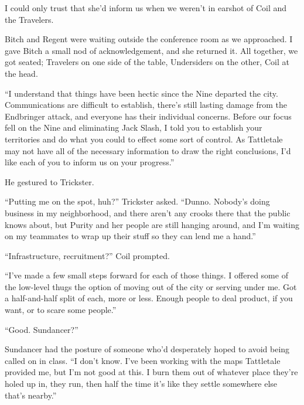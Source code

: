 I could only trust that she'd inform us when we weren't in earshot of Coil and the Travelers.



Bitch and Regent were waiting outside the conference room as we approached.  I gave Bitch a small nod of acknowledgement, and she returned it.  All together, we got seated; Travelers on one side of the table, Undersiders on the other, Coil at the head.



``I understand that things have been hectic since the Nine departed the city.  Communications are difficult to establish, there's still lasting damage from the Endbringer attack, and everyone has their individual concerns.  Before our focus fell on the Nine and eliminating Jack Slash, I told you to establish your territories and do what you could to effect some sort of control.  As Tattletale may not have all of the necessary information to draw the right conclusions, I'd like each of you to inform us on your progress.''



He gestured to Trickster.



``Putting me on the spot, huh?''  Trickster asked.  ``Dunno.  Nobody's doing business in my neighborhood, and there aren't any crooks there that the public knows about, but Purity and her people are still hanging around, and I'm waiting on my teammates to wrap up their stuff so they can lend me a hand.''



``Infrastructure, recruitment?'' Coil prompted.



``I've made a few small steps forward for each of those things.  I offered some of the low-level thugs the option of moving out of the city or serving under me.  Got a half-and-half split of each, more or less.  Enough people to deal product, if you want, or to scare some people.''



``Good.  Sundancer?''



Sundancer had the posture of someone who'd desperately hoped to avoid being called on in class.  ``I don't know.  I've been working with the maps Tattletale provided me, but I'm not good at this.  I burn them out of whatever place they're holed up in, they run, then half the time it's like they settle somewhere else that's nearby.''



